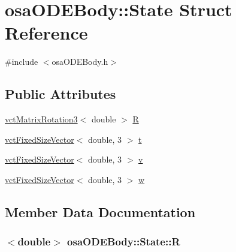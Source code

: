 \hypertarget{structosa_o_d_e_body_1_1_state}{}\section{osa\+O\+D\+E\+Body\+:\+:State Struct Reference}
\label{structosa_o_d_e_body_1_1_state}


{\ttfamily \#include $<$osa\+O\+D\+E\+Body.\+h$>$}

\subsection*{Public Attributes}
\begin{DoxyCompactItemize}
\item 
\hyperlink{classvct_matrix_rotation3}{vct\+Matrix\+Rotation3}$<$ double $>$ \hyperlink{structosa_o_d_e_body_1_1_state_ac33054b81088a4dd9436b1418da1c92c}{R}
\item 
\hyperlink{classvct_fixed_size_vector}{vct\+Fixed\+Size\+Vector}$<$ double, 3 $>$ \hyperlink{structosa_o_d_e_body_1_1_state_a875d11546272dcb6115ab1a4d7855370}{t}
\item 
\hyperlink{classvct_fixed_size_vector}{vct\+Fixed\+Size\+Vector}$<$ double, 3 $>$ \hyperlink{structosa_o_d_e_body_1_1_state_a6158fd319c583980e491d74b490083f6}{v}
\item 
\hyperlink{classvct_fixed_size_vector}{vct\+Fixed\+Size\+Vector}$<$ double, 3 $>$ \hyperlink{structosa_o_d_e_body_1_1_state_af6b430eb6faf7e341b4647b5cd690c07}{w}
\end{DoxyCompactItemize}


\subsection{Member Data Documentation}
\hypertarget{structosa_o_d_e_body_1_1_state_ac33054b81088a4dd9436b1418da1c92c}{}
\subsubsection[{R}]{$<$double$>$ osa\+O\+D\+E\+Body\+::\+State\+::\+R}\label{structosa_o_d_e_body_1_1_state_ac33054b81088a4dd9436b1418da1c92c}
\hypertarget{structosa_o_d_e_body_1_1_state_a875d11546272dcb6115ab1a4d7855370}{}
